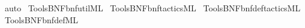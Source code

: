 \begin{isabellebody}
\ auto%
\endisatagproof
{\isafoldproof}%
%
\isadelimproof
\isanewline
%
\endisadelimproof
%
\isadelimML
\isanewline
%
\endisadelimML
%
\isatagML
{}\isamarkupfalse%
\ {\isacartoucheopen}Tools{\isacharslash}{\kern0pt}BNF{\isacharslash}{\kern0pt}bnf{\isacharunderscore}{\kern0pt}util{\isachardot}{\kern0pt}ML{\isacartoucheclose}\isanewline
{}\isamarkupfalse%
\ {\isacartoucheopen}Tools{\isacharslash}{\kern0pt}BNF{\isacharslash}{\kern0pt}bnf{\isacharunderscore}{\kern0pt}tactics{\isachardot}{\kern0pt}ML{\isacartoucheclose}\isanewline
{}\isamarkupfalse%
\ {\isacartoucheopen}Tools{\isacharslash}{\kern0pt}BNF{\isacharslash}{\kern0pt}bnf{\isacharunderscore}{\kern0pt}def{\isacharunderscore}{\kern0pt}tactics{\isachardot}{\kern0pt}ML{\isacartoucheclose}\isanewline
{}\isamarkupfalse%
\ {\isacartoucheopen}Tools{\isacharslash}{\kern0pt}BNF{\isacharslash}{\kern0pt}bnf{\isacharunderscore}{\kern0pt}def{\isachardot}{\kern0pt}ML{\isacartoucheclose}%
\endisatagML
{\isafoldML}%
%
\isadelimML
\isanewline
%
\endisadelimML
%
\isadelimtheory
\isanewline
%
\endisadelimtheory
%
\isatagtheory
{}\isamarkupfalse%
%
\endisatagtheory
{\isafoldtheory}%
%
\isadelimtheory
%
\endisadelimtheory
%
\end{isabellebody}%
\endinput
